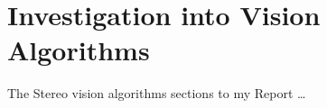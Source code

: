 \chapter{Investigation into Vision Algorithms} \label{Chapter:InvestigationVision}
The Stereo vision algorithms sections to my Report \dots
